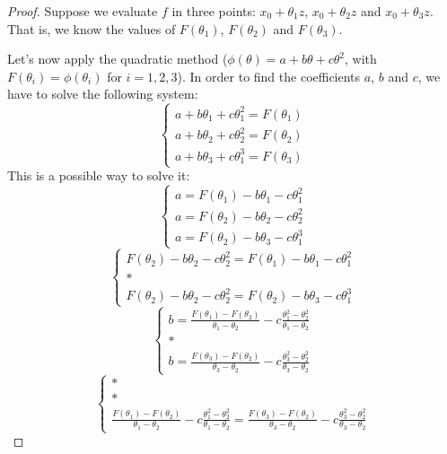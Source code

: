 \begin{proof}
    Suppose we evaluate \(f\) in three points: \(x_0 + \theta_1 z\), \(x_0 + \theta_2 z\) and \(x_0 + \theta_3 z\). That is, we know the values of \(F(\theta_1)\), \(F(\theta_2)\) and \(F(\theta_3)\).\par
    Let's now apply the quadratic method (\(\phi(\theta) = a + b\theta + c\theta^2\), with \(F(\theta_i) = \phi(\theta_i)\) for \(i=1,2,3\)). In order to find the coefficients \(a\), \(b\) and \(c\), we have to solve the following system:
    \[
        \begin{cases}
            a + b\theta_1 + c\theta_1^2 = F(\theta_1) \\
            a + b\theta_2 + c\theta_2^2 = F(\theta_2) \\
            a + b\theta_3 + c\theta_1^3 = F(\theta_3)
        \end{cases}
    \]
    This is a possible way to solve it:
    \[
        \begin{cases}
            a = F(\theta_1) - b\theta_1 - c\theta_1^2 \\
            a = F(\theta_2) - b\theta_2 - c\theta_2^2 \\
            a = F(\theta_2) - b\theta_3 - c\theta_1^3
        \end{cases}
    \]
    \[
        \begin{cases}
            F(\theta_2) - b\theta_2 - c\theta_2^2 = F(\theta_1) - b\theta_1 - c\theta_1^2 \\
            * \\
            F(\theta_2) - b\theta_2 - c\theta_2^2 = F(\theta_2) - b\theta_3 - c\theta_1^3
        \end{cases}
    \]
    \[
        \begin{cases}
            b = \frac{F(\theta_1) - F(\theta_2)}{\theta_1 - \theta_2} - c\frac{\theta_1^2 - \theta_2^2}{\theta_1 - \theta_2} \\
            * \\
            b = \frac{F(\theta_3) - F(\theta_2)}{\theta_3 - \theta_2} - c\frac{\theta_3^2 - \theta_2^2}{\theta_3 - \theta_2}
        \end{cases}
    \]
    \[
        \begin{cases}
            * \\
            * \\
            \frac{F(\theta_1) - F(\theta_2)}{\theta_1 - \theta_2} - c\frac{\theta_1^2 - \theta_2^2}{\theta_1 - \theta_2} = \frac{F(\theta_3) - F(\theta_2)}{\theta_3 - \theta_2} - c\frac{\theta_3^2 - \theta_2^2}{\theta_3 - \theta_2}

\end{cases}\]
\end{proof}
